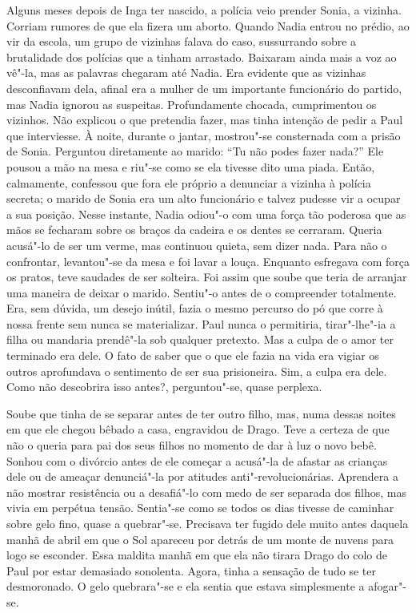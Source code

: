 Alguns meses depois de Inga ter nascido, a polícia veio prender Sonia, a
vizinha. Corriam rumores de que ela fizera um aborto. Quando Nadia
entrou no prédio, ao vir da escola, um grupo de vizinhas falava do caso,
sussurrando sobre a brutalidade dos polícias que a tinham arrastado.
Baixaram ainda mais a voz ao vê"-la, mas as palavras chegaram até
Nadia. Era evidente que as vizinhas desconfiavam dela, afinal era a
mulher de um importante funcionário do partido, mas Nadia ignorou as
suspeitas. Profundamente chocada, cumprimentou os vizinhos. Não
explicou o que pretendia fazer, mas tinha intenção de pedir a Paul que
interviesse. À noite, durante o jantar, mostrou"-se consternada com a
prisão de Sonia. Perguntou diretamente ao marido: ``Tu não podes fazer
nada?'' Ele pousou a mão na mesa e riu"-se como se ela tivesse dito uma
piada. Então, calmamente, confessou que fora ele próprio a denunciar a
vizinha à polícia secreta; o marido de Sonia era um alto funcionário e
talvez pudesse vir a ocupar a sua posição. Nesse instante, Nadia odiou"-o
com uma força tão poderosa que as mãos se fecharam sobre os braços da
cadeira e os dentes se cerraram. Queria acusá"-lo de ser um verme, mas
continuou quieta, sem dizer nada. Para não o confrontar, levantou"-se da
mesa e foi lavar a louça. Enquanto esfregava com força os pratos, teve
saudades de ser solteira. Foi assim que soube que teria de arranjar uma
maneira de deixar o marido. Sentiu"-o antes de o compreender totalmente.
Era, sem dúvida, um desejo inútil, fazia o mesmo percurso do pó que
corre à nossa frente sem nunca se materializar. Paul nunca o permitiria,
tirar"-lhe"-ia a filha ou mandaria prendê"-la sob qualquer pretexto. Mas a culpa de o amor ter terminado era
dele. O fato de saber que o que ele fazia na vida era vigiar os outros
aprofundava o sentimento de ser sua prisioneira. Sim, a culpa era dele.
Como não descobrira isso antes?, perguntou"-se, quase perplexa.

Soube que tinha de se separar antes de ter outro filho, mas, numa dessas
noites em que ele chegou bêbado a casa, engravidou de Drago. Teve a
certeza de que não o queria para pai dos seus filhos no momento de dar à
luz o novo bebê. Sonhou com o divórcio antes de ele começar a acusá"-la de afastar as crianças dele ou de ameaçar denunciá"-la por atitudes
anti"-revolucionárias. Aprendera a não mostrar resistência ou a
desafiá"-lo com medo de ser separada dos filhos, mas vivia em perpétua
tensão. Sentia"-se como se todos os dias tivesse de caminhar sobre gelo
fino, quase a quebrar"-se. Precisava ter fugido dele muito antes
daquela manhã de abril em que o Sol apareceu por detrás de um monte de
nuvens para logo se esconder. Essa maldita manhã em que ela não tirara
Drago do colo de Paul por estar demasiado sonolenta. Agora, tinha a
sensação de tudo se ter desmoronado. O gelo quebrara"-se e ela sentia que
estava simplesmente a afogar"-se.


